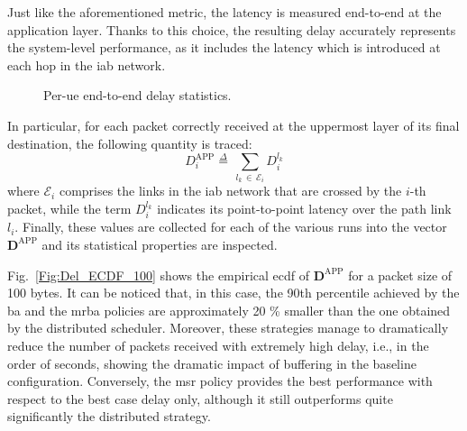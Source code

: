 Just like the aforementioned metric, the latency is measured end-to-end at the application layer. Thanks to this choice, the resulting delay accurately represents the system-level performance, as it includes the latency which is introduced at each hop in the \gls{iab} network.

\begin{figure}[t!]
	\centering
    \hfill
    \centering
   \caption{Per-\gls{ue} end-to-end delay statistics.}
  \label{Fig:Delay_stats}
    \vspace{-.6cm} 
\end{figure}

In particular, for each packet correctly received at the uppermost layer of its final destination, the following quantity is traced:
\[ D^{\mathrm{APP}}_{i} \mathop = \limits^{\Delta} \, \sum_{l_k \, \in \, \mathcal{E}_{i}} D^{l_k}_i \] 
where $\mathcal{E}_{i}$  comprises the links in the \gls{iab} network that are crossed by the $i$-th packet, while the term $D^{l_k}_i$ indicates its point-to-point latency over the path link $l_i$. 
Finally, these values are collected for each of the various runs into the vector $\mathbf{D}^{\mathrm{APP}}$ and its statistical properties are inspected.

Fig.~\ref{Fig:Del_ECDF_100} shows the empirical \gls{ecdf} of $\mathbf{D}^{\mathrm{APP}}$ for a packet size of 100 bytes. It can be noticed that, in this case, the 90th percentile achieved by the \gls{ba} and the \gls{mrba} policies are approximately 20 \% smaller than the one obtained by the distributed scheduler. Moreover, these strategies manage to dramatically reduce the number of packets received with extremely high delay, i.e., in the order of seconds, showing the dramatic impact of buffering in the baseline configuration. Conversely, the \gls{msr} policy provides the best performance with respect to the best case delay only, although it still outperforms quite  significantly the distributed strategy. 

